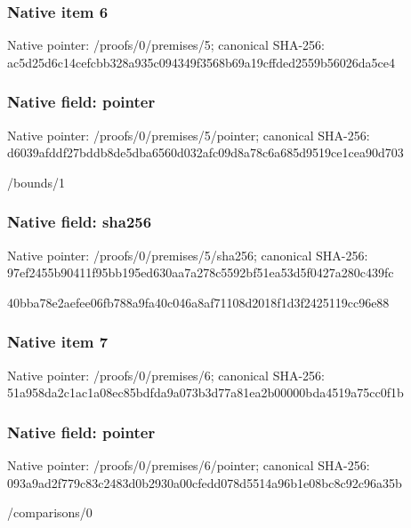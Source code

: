 \documentclass[10pt,a4paper]{article}
\begin{document}
\subsubsection{Native item 6}


Native pointer: /proofs/0/premises/5; canonical SHA-256: ac5d25d6c14cefcbb328a935\allowbreak{}c094349f3568b69a19cffded\allowbreak{}2559b56026da5ce4



\subsubsection{Native field: pointer}


Native pointer: /proofs/0/premises/5/pointer; canonical SHA-256: d6039afddf27bddb8de5dba6\allowbreak{}560d032afc09d8a78c6a685d\allowbreak{}9519ce1cea90d703


/bounds/1


\subsubsection{Native field: sha256}


Native pointer: /proofs/0/premises/5/sha256; canonical SHA-256: 97ef2455b90411f95bb195ed\allowbreak{}630aa7a278c5592bf51ea53d\allowbreak{}5f0427a280c439fc


40bba78e2aefee06fb788a9f\allowbreak{}a40c046a8af71108d2018f1d\allowbreak{}3f2425119cc96e88


\subsubsection{Native item 7}


Native pointer: /proofs/0/premises/6; canonical SHA-256: 51a958da2c1ac1a08ec85bdf\allowbreak{}da9a073b3d77a81ea2b00000\allowbreak{}bda4519a75cc0f1b



\subsubsection{Native field: pointer}


Native pointer: /proofs/0/premises/6/pointer; canonical SHA-256: 093a9ad2f779c83c2483d0b2\allowbreak{}930a00cfedd078d5514a96b1\allowbreak{}e08bc8c92c96a35b


/comparisons/0
\end{document}
